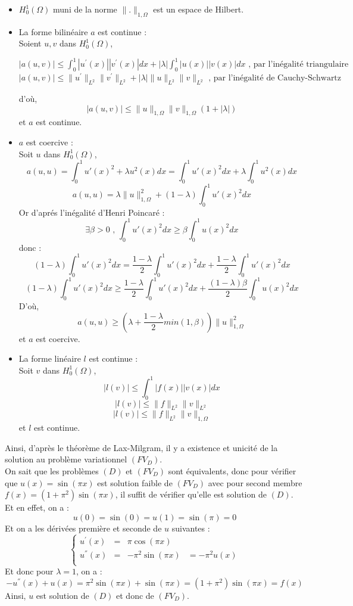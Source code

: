 \documentclass[a4paper,12pt]{article}
\begin{document}
\begin{itemize}
  \item $H_{0}^{1}(\Omega)$ muni de la norme $\|.\|_{1,\Omega}$ est un espace de Hilbert.
	\item La forme bilin\'eaire $a$ est continue :\\
Soient $u,v$ dans $H_{0}^{1}(\Omega)$,
\begin{center}
  $|a(u,v)| \leq \int_{0}^{1} {|u^{'}(x)||v^{'}(x)| dx}+|\lambda|\int_{0}^{1} {|u(x)||v(x)| dx} \text{ , par l'in\'egalit\'e triangulaire}$
	$|a(u,v)| \leq \|u^{'}\|_{L^{2}}\|v^{'}\|_{L^{2}}+|\lambda|\|u\|_{L^{2}}\|v\|_{L^{2}} \text{ , par l'in\'egalit\'e de Cauchy-Schwartz}$
\end{center}
d'o\`u,
	\[|a(u,v)| \leq \|u\|_{1,\Omega}\|v\|_{1,\Omega}(1+|\lambda|)\]
et $a$ est continue.
  \item $a$ est coercive :\\
Soit $u$ dans $H_{0}^{1}(\Omega)$,
\[a(u,u)=\int_{0}^{1} {u'(x)^{2}+\lambda u^{2}(x) dx}=\int_{0}^{1} {u'(x)^{2} dx}+\lambda\int_{0}^{1} {u^{2}(x) dx}\]
\[a(u,u)=\lambda \|u\|_{1,\Omega}^{2}+(1-\lambda)\int_{0}^{1}{u'(x)^{2} dx}\]
Or d'apr\'es l'in\'egalit\'e d'Henri Poincar\'e :\\
\[\exists \beta > 0 \text{ , } \int_{0}^{1}{u'(x)^{2} dx} \geq \beta\int_{0}^{1}{u(x)^{2} dx}\]
donc :
\[(1-\lambda)\int_{0}^{1}{u'(x)^{2} dx} = \frac{1-\lambda}{2}\int_{0}^{1}{u'(x)^{2} dx}+\frac{1-\lambda}{2}\int_{0}^{1}{u'(x)^{2} dx}\]
\[(1-\lambda)\int_{0}^{1}{u'(x)^{2} dx} \geq \frac{1-\lambda}{2}\int_{0}^{1}{u'(x)^{2} dx}+\frac{(1-\lambda)\beta}{2}\int_{0}^{1}{u(x)^{2} dx}\]
D'o\`u,
\[a(u,u) \geq \left(\lambda+\frac{1-\lambda}{2}min(1,\beta)\right)\|u\|_{1,\Omega}^{2}\]
et $a$ est coercive.
  \item La forme lin\'eaire $l$ est continue :\\
	Soit $v$ dans $H_{0}^{1}(\Omega)$,
	\[|l(v)| \leq \int_{0}^{1} {|f(x)||v(x)| dx}\]
	\[|l(v)| \leq \|f\|_{L^{2}}\|v\|_{L^{2}}\]
	\[|l(v)| \leq \|f\|_{L^{2}}\|v\|_{1,\Omega}\]
et $l$ est continue.
\end{itemize}
Ainsi, d'apr\`es le th\'eor\`eme de Lax-Milgram, il y a existence et unicit\'e de la solution au probl\`eme variationnel $(FV_{D})$.\\
On sait que les probl\`emes $(D)$ et $(FV_D)$ sont \'equivalents, donc pour v\'erifier que $u(x)=\sin(\pi x)$ est solution faible de $(FV_D)$ avec pour second membre $f(x)=(1+\pi^{2})\sin(\pi x)$, il suffit de v\'erifier qu'elle est solution de $(D)$. Et en effet, on a :
\[u(0)=\sin(0)=u(1)=\sin(\pi)=0\]
Et on a les d\'eriv\'ees premi\`ere et seconde de $u$ suivantes :
\[\left\{\begin{array}{ccccc}
u^{'}(x)&=&\pi\cos(\pi x) &\\
u^{''}(x)&=&-\pi^{2}\sin(\pi x) & =-\pi^{2}u(x)\\
\end{array}
\right.
\]
Et donc pour $\lambda=1$, on a :
\[-u^{''}(x)+u(x)=\pi^{2}\sin(\pi x)+\sin(\pi x)=(1+\pi^{2})\sin(\pi x)=f(x)\]
Ainsi, $u$ est solution de $(D)$ et donc de $(FV_D)$.
\end{document}
